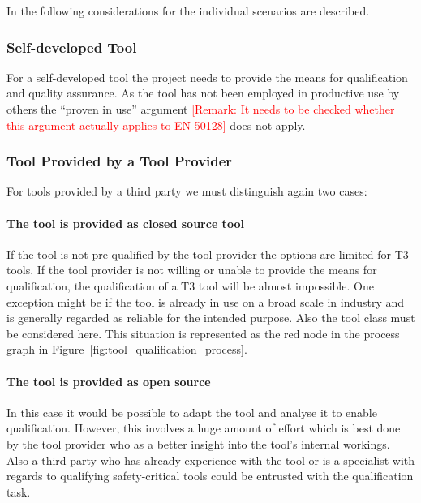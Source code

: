 In the following considerations for the individual scenarios are described.

\subsubsection{Self-developed Tool}

For a self-developed tool the project needs to provide the means for qualification and quality assurance. As the tool has not been employed in productive use by others the ``proven in use'' argument \textcolor{red}{[Remark: It needs to be checked whether this argument actually applies to EN 50128]} does not apply.

\subsubsection{Tool Provided by a Tool Provider}

For tools provided by a third party we must distinguish again two cases:

\paragraph{The tool is provided as closed source tool}

If the tool is not pre-qualified by the tool provider the options are limited for T3 tools. If the tool provider is not willing or unable to provide the means for qualification, the qualification of a T3 tool will be almost impossible. One exception might be if the tool is already in use on a broad scale in industry and is generally regarded as reliable for the intended purpose. Also the tool class must be considered here. This situation is represented as the red node in the process graph in Figure~\ref{fig:tool_qualification_process}.

\paragraph{The tool is provided as open source}

In this case it would be possible to adapt the tool and analyse it to enable qualification. However, this involves a huge amount of effort which is best done by the tool provider who as a better insight into the tool's internal workings. Also a third party who has already experience with the tool or is a specialist with regards to qualifying safety-critical tools could be entrusted with the qualification task.

